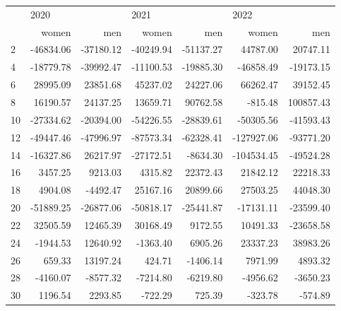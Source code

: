 \begin{tabular}{lrrrrrr}
\toprule
{} & \multicolumn{2}{l}{2020} & \multicolumn{2}{l}{2021} & \multicolumn{2}{l}{2022} \\
{} &     women &       men &     women &       men &      women &        men \\
\midrule
2  & -46834.06 & -37180.12 & -40249.94 & -51137.27 &   44787.00 &   20747.11 \\
4  & -18779.78 & -39992.47 & -11100.53 & -19885.30 &  -46858.49 &  -19173.15 \\
6  &  28995.09 &  23851.68 &  45237.02 &  24227.06 &   66262.47 &   39152.45 \\
8  &  16190.57 &  24137.25 &  13659.71 &  90762.58 &    -815.48 &  100857.43 \\
10 & -27334.62 & -20394.00 & -54226.55 & -28839.61 &  -50305.56 &  -41593.43 \\
12 & -49447.46 & -47996.97 & -87573.34 & -62328.41 & -127927.06 &  -93771.20 \\
14 & -16327.86 &  26217.97 & -27172.51 &  -8634.30 & -104534.45 &  -49524.28 \\
16 &   3457.25 &   9213.03 &   4315.82 &  22372.43 &   21842.12 &   22218.33 \\
18 &   4904.08 &  -4492.47 &  25167.16 &  20899.66 &   27503.25 &   44048.30 \\
20 & -51889.25 & -26877.06 & -50818.17 & -25441.87 &  -17131.11 &  -23599.40 \\
22 &  32505.59 &  12465.39 &  30168.49 &   9172.55 &   10491.33 &  -23658.58 \\
24 &  -1944.53 &  12640.92 &  -1363.40 &   6905.26 &   23337.23 &   38983.26 \\
26 &    659.33 &  13197.24 &    424.71 &  -1406.14 &    7971.99 &    4893.32 \\
28 &  -4160.07 &  -8577.32 &  -7214.80 &  -6219.80 &   -4956.62 &   -3650.23 \\
30 &   1196.54 &   2293.85 &   -722.29 &    725.39 &    -323.78 &    -574.89 \\
\bottomrule
\end{tabular}

